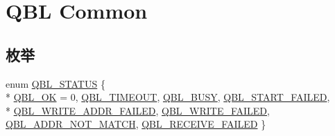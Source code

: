 \hypertarget{group__qbl}{}\section{Q\+BL Common}
\label{group__qbl}
\subsection*{枚举}
\begin{DoxyCompactItemize}
\item 
enum \hyperlink{group__qbl_ga41526b685f55486191108499fe91c30b}{Q\+B\+L\+\_\+\+S\+T\+A\+T\+US} \{ \\*
\hyperlink{group__qbl_gga41526b685f55486191108499fe91c30bac339d014a999e1d614721110672e1ad9}{Q\+B\+L\+\_\+\+OK} = 0, 
\hyperlink{group__qbl_gga41526b685f55486191108499fe91c30ba654a5a717eb326de65c78984d2fcedb8}{Q\+B\+L\+\_\+\+T\+I\+M\+E\+O\+UT}, 
\hyperlink{group__qbl_gga41526b685f55486191108499fe91c30ba3295fefcc0c943fce64ad4d72be4edec}{Q\+B\+L\+\_\+\+B\+U\+SY}, 
\hyperlink{group__qbl_gga41526b685f55486191108499fe91c30baa1394dd50bddb4d957f937385c5f93a2}{Q\+B\+L\+\_\+\+S\+T\+A\+R\+T\+\_\+\+F\+A\+I\+L\+ED}, 
\\*
\hyperlink{group__qbl_gga41526b685f55486191108499fe91c30baee9299722a126dba22c76d3d9e5971e3}{Q\+B\+L\+\_\+\+W\+R\+I\+T\+E\+\_\+\+A\+D\+D\+R\+\_\+\+F\+A\+I\+L\+ED}, 
\hyperlink{group__qbl_gga41526b685f55486191108499fe91c30ba1be03d0c1d667116cb382a49df76e223}{Q\+B\+L\+\_\+\+W\+R\+I\+T\+E\+\_\+\+F\+A\+I\+L\+ED}, 
\hyperlink{group__qbl_gga41526b685f55486191108499fe91c30ba168ae4cc03a406e4ea624f38fecedbc9}{Q\+B\+L\+\_\+\+A\+D\+D\+R\+\_\+\+N\+O\+T\+\_\+\+M\+A\+T\+CH}, 
\hyperlink{group__qbl_gga41526b685f55486191108499fe91c30ba375b50b21bdbe1f3bfa11253fb3cdb12}{Q\+B\+L\+\_\+\+R\+E\+C\+E\+I\+V\+E\+\_\+\+F\+A\+I\+L\+ED}
 \}
\end{DoxyCompactItemize}
